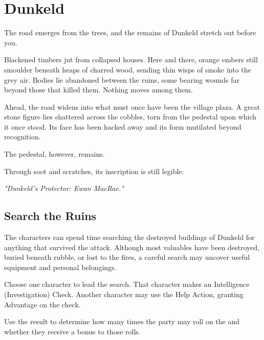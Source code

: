 \chapter*{Dunkeld}


\begin{DndReadAloud}
	The road emerges from the trees, and the remains of Dunkeld stretch out before you.

	Blackened timbers jut from collapsed houses. Here and there, orange embers still smoulder beneath heaps of charred wood, sending thin wisps of smoke into the grey air. Bodies lie abandoned between the ruins, some bearing wounds far beyond those that killed them. Nothing moves among them.

	Ahead, the road widens into what must once have been the village plaza. A great stone figure lies shattered across the cobbles, torn from the pedestal upon which it once stood. Its face has been hacked away and its form mutilated beyond recognition.

	The pedestal, however, remains.

	Through soot and scratches, its inscription is still legible:

	\textit{"Dunkeld's Protector: Ewan MacRae."}
\end{DndReadAloud}

\section*{Search the Ruins}
{\entryfont The characters can spend time searching the destroyed buildings of Dunkeld for anything that survived the attack. Although most valuables have been destroyed, buried beneath rubble, or lost to the fires, a careful search may uncover useful equipment and personal belongings.

Choose one character to lead the search. That character makes an Intelligence (Investigation) Check. Another character may use the Help Action, granting Advantage on the check.

Use the result to determine how many times the party may roll on the \hyperref[table:DunkeldLoot]{} and whether they receive a bonus to those rolls.}

